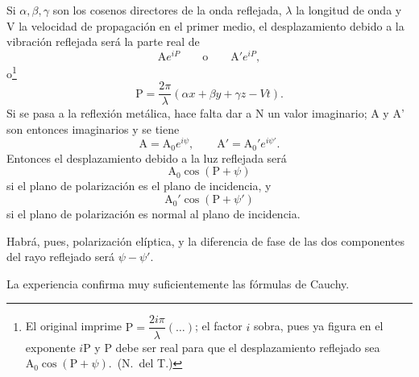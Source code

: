 Si $\alpha,\beta,\gamma$ son los cosenos directores de la onda reflejada,
$\lambda$ la longitud de onda y V la velocidad de propagación en el
primer medio, el desplazamiento debido a la vibración reflejada será la
parte real de
\[
\mathrm{A}e^{iP}\qquad\text{o}\qquad \mathrm{A}'e^{iP},
\]
o\footnote{El original imprime $\mathrm{P}=\dfrac{2i\pi}{\lambda}(\ldots)$;
el factor $i$ sobra, pues ya figura en el exponente $i\mathrm{P}$ y
$\mathrm{P}$ debe ser real para que el desplazamiento reflejado sea
$\mathrm{A}_0\cos(\mathrm{P}+\psi)$.~(N.~del T.)}
\[
\mathrm{P}=\frac{2\pi}{\lambda}(\alpha x+\beta y+\gamma z-Vt).
\]
Si se pasa a la reflexión metálica, hace falta dar a N un valor
imaginario; A y A' son entonces imaginarios y se tiene
\[
\mathrm{A}=\mathrm{A}_0e^{i\psi},\qquad \mathrm{A}'=\mathrm{A}_0'e^{i\psi'}.
\]
Entonces el desplazamiento debido a la luz reflejada será
\[
\mathrm{A}_0\cos(\mathrm{P}+\psi)
\]
si el plano de polarización es el plano de incidencia, y
\[
\mathrm{A}_0'\cos(\mathrm{P}+\psi')
\]
si el plano de polarización es normal al plano de incidencia.

Habrá, pues, polarización elíptica, y la diferencia de fase de las dos
componentes del rayo reflejado será $\psi-\psi'$.

La experiencia confirma muy suficientemente las fórmulas de Cauchy.

